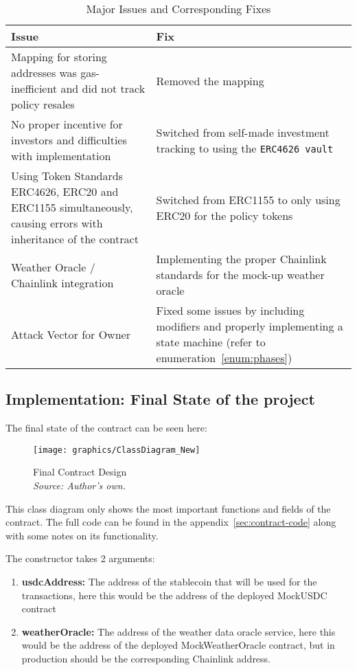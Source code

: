 \documentclass[11pt,a4paper]{article}
\begin{document}
		\begin{table}[htbp]
			\centering
			\caption{Major Issues and Corresponding Fixes}
			\label{tab:issues-fixes}
			\begin{tabular}{|p{0.42\textwidth}|p{}|}
				\hline
				\textbf{Issue} & \textbf{Fix} \\
				\hline
				Mapping for storing addresses was gas-inefficient and did not track policy resales & Removed the mapping \\
				\hline
				No proper incentive for investors and difficulties with implementation & Switched from self-made investment tracking to using the \texttt{ERC4626 vault} \\
				\hline
				Using Token Standards ERC4626, ERC20 and ERC1155 simultaneously, causing errors with inheritance of the contract & Switched from ERC1155 to only using ERC20 for the policy tokens \\
				\hline
				Weather Oracle / Chainlink integration & Implementing the proper Chainlink standards for the mock-up weather oracle~\parencite{AggregatorV3Interface} \\
				\hline
				Attack Vector for Owner & Fixed some issues by including modifiers and properly implementing a state machine (refer to enumeration~\ref{enum:phases}) \\
				\hline
			\end{tabular}
		\end{table}


		\subsection{Implementation: Final State of the project}\label{subsec:final-state}

		The final state of the contract can be seen here:

		\begin{figure}[htbp]
			\centering
			\texttt{[image: graphics/ClassDiagram\_New]}
			\caption{Final Contract Design \\ \textit{Source: Author's own.}}
			\label{fig:final-contract-design}
		\end{figure}

		This class diagram only shows the most important functions and fields of the contract.
		The full code can be found in the appendix~\ref{sec:contract-code} along with some notes on its functionality.

		The constructor takes 2 arguments:
		\begin{enumerate}[(1)]
			\item \textbf{usdcAddress:} The address of the stablecoin that will be used for the transactions, here this would be the address of the deployed MockUSDC contract
			\item \textbf{weatherOracle:} The address of the weather data oracle service, here this would be the address of the deployed MockWeatherOracle contract, but in production should be the corresponding Chainlink address.
		\end{enumerate}
\end{document}
